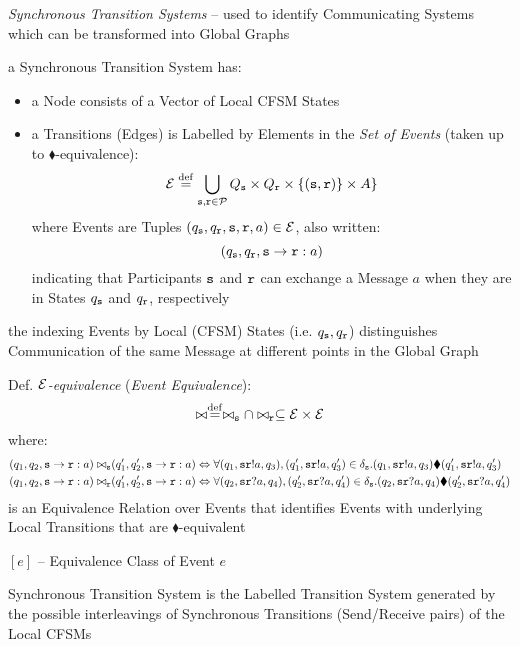 
\emph{Synchronous Transition Systems} -- used to identify
Communicating Systems which can be transformed into Global Graphs

a Synchronous Transition System has:
\begin{itemize}
\item a Node consists of a Vector of Local CFSM States
\item a Transitions (Edges) is Labelled by Elements in the \emph{Set
  of Events} (taken up to $\blacklozenge$-equivalence):
\[
  \mathcal{E} \stackrel{\mathrm{def}}= \bigcup_{\mathtt{s,r\in\mathcal{P}}} Q_\mathtt{s} \times
    Q_\mathtt{r} \times \{(\mathtt{s,r})\} \times A \}
\]
where Events are Tuples
$(q_\mathtt{s},q_\mathtt{r},\mathtt{s},\mathtt{r},a) \in \mathcal{E}$, also
written:
\[
  (q_\mathtt{s},q_\mathtt{r},\mathtt{s}\rightarrow\mathtt{r}:a)
\]
indicating that Participants $\mathtt{s}$ and $\mathtt{r}$ can exchange
a Message $a$ when they are in States $q_\mathtt{s}$ and $q_\mathtt{r}$,
respectively
\end{itemize}

the indexing Events by Local (CFSM) States (i.e. $q_\mathtt{s},
q_\mathtt{r}$) distinguishes Communication of the same Message at
different points in the Global Graph

Def. \emph{$\mathcal{E}$-equivalence} (\emph{Event Equivalence}):
\[
  \bowtie \stackrel{\mathrm{def}}= \bowtie_\mathtt{s} \cap \bowtie_\mathtt{r}
    \subseteq \mathcal{E} \times \mathcal{E}
\]
where:
\begin{align*}
  (q_1,q_2, \mathtt{s}\rightarrow\mathtt{r} : a) \bowtie_\mathtt{s}&
    (q_1',q_2', \mathtt{s}\rightarrow\mathtt{r} : a) \Leftrightarrow
    \forall(q_1,\mathtt{sr}!a,q_3),(q_1',\mathtt{sr}!a,q_3')
      \in \delta_\mathtt{s}
    . (q_1,\mathtt{sr}!a,q_3)\blacklozenge(q_1',\mathtt{sr}!a,q_3')
  \\
  (q_1,q_2, \mathtt{s}\rightarrow\mathtt{r} : a) \bowtie_\mathtt{r}&
    (q_1',q_2', \mathtt{s}\rightarrow\mathtt{r} : a) \Leftrightarrow
    \forall(q_2,\mathtt{sr}?a,q_4),(q_2',\mathtt{sr}?a,q_4')
      \in \delta_\mathtt{s}
    . (q_2,\mathtt{sr}?a,q_4)\blacklozenge(q_2',\mathtt{sr}?a,q_4')
\end{align*}
is an Equivalence Relation over Events that identifies Events with
underlying Local Transitions that are $\blacklozenge$-equivalent

$[e]$ -- Equivalence Class of Event $e$

Synchronous Transition System is the Labelled Transition System
generated by the possible interleavings of Synchronous Transitions
(Send/Receive pairs) of the Local CFSMs

